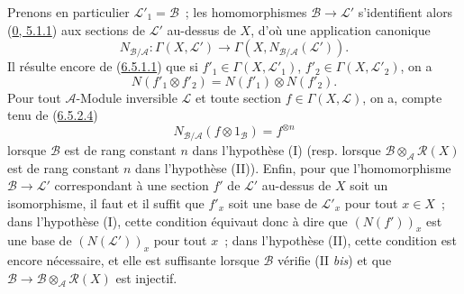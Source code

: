 \begin{env}[6.5.3]
Prenons en particulier $\mathcal{L}'_1=\mathcal{B}$~; les homomorphismes
$\mathcal{B}\to\mathcal{L}'$ s'identifient alors
(\hyperref[0.5.1.1-fr]{0, 5.1.1}) aux sections de $\mathcal{L}'$ au-dessus de
$X$, d'où une application canonique
\[
N_{\mathcal{B}/\mathcal{A}}:\Gamma(X,\mathcal{L}')
\to\Gamma(X,N_{\mathcal{B}/\mathcal{A}}(\mathcal{L}')).
\]
Il résulte encore de (\hyperref[II.6.5.1.1-fr]{6.5.1.1}) que si
$f'_1\in\Gamma(X,\mathcal{L}'_1)$, $f'_2\in\Gamma(X,\mathcal{L}'_2)$, on a
\[
\label{II.6.5.3.1-fr}
N(f'_1\otimes f'_2)=N(f'_1)\otimes N(f'_2).
\tag{6.5.3.1}
\]
Pour tout $\mathcal{A}$-Module inversible $\mathcal{L}$ et toute section
$f\in\Gamma(X,\mathcal{L})$, on a, compte tenu de
(\hyperref[II.6.5.2.4-fr]{6.5.2.4})
\[
\label{II.6.5.3.2-fr}
N_{\mathcal{B}/\mathcal{A}}(f\otimes1_{\mathcal{B}})=f^{\otimes n}
\tag{6.5.3.2}
\]
lorsque $\mathcal{B}$ est de rang constant $n$ dans l'hypothèse (I) (resp.
lorsque $\mathcal{B}\otimes_{\mathcal{A}}\mathcal{R}(X)$ est de rang constant
$n$ dans l'hypothèse (II)). Enfin, pour que l'homomorphisme
$\mathcal{B}\to\mathcal{L}'$ correspondant à une section $f'$ de
$\mathcal{L}'$ au-dessus de $X$ soit un isomorphisme, il faut et il suffit que
$f'_x$ soit une base de $\mathcal{L}'_x$ pour tout $x\in X$~; dans l'hypothèse
(I), cette condition équivaut donc à dire que $(N(f'))_x$ est une base de
$(N(\mathcal{L}'))_x$ pour tout $x$~; dans l'hypothèse (II), cette condition
est encore nécessaire, et elle est suffisante lorsque $\mathcal{B}$ vérifie
(II \emph{bis}) et que
$\mathcal{B}\to\mathcal{B}\otimes_{\mathcal{A}}\mathcal{R}(X)$ est injectif.
\end{env}

